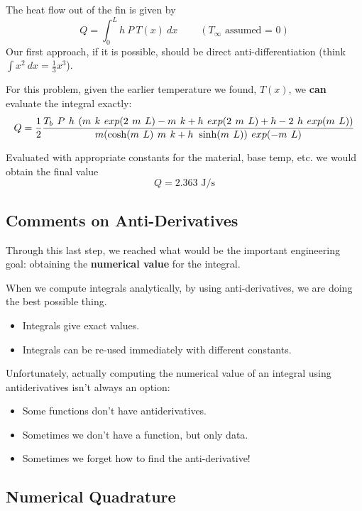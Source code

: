 The heat flow out of the fin is given by
$$
Q = \int_0^{L} h ~P ~T(x) ~dx   ~~~~~~~~~~ (T_\infty \mbox{ assumed = 0})
$$
Our first approach, if it is possible, should be direct
anti-differentiation (think $\int x^2 ~dx = \frac{1}{3}x^3$).

For this problem, given the earlier temperature we found, $T(x)$, we
{\bf can} evaluate the integral exactly:
$$ \large
Q =
\frac{1}{2}\frac{T_b~P~h~(m~k~exp(2~m~L)-m~k+h~exp(2~m~L)+h-2~h~exp(m~L))}{m(\cosh(m~L)~m~k+h~\sinh(m~L))~exp(-m~L)}
$$
 

Evaluated with appropriate constants for the material, base temp,
etc. we would obtain the final value $$Q = 2.363 \mbox{ J/s}$$

\newpage

\subsection*{Comments on Anti-Derivatives}

Through this last step, we reached what would be the important
engineering goal: obtaining the {\bf numerical value} for the
integral.

When we compute integrals analytically, by using anti-derivatives, we
are doing the best possible thing. 
\begin{itemize}
\item Integrals give exact values.
\item Integrals can be re-used immediately with different constants.
\end{itemize}
Unfortunately, actually computing the numerical value of an integral
using antiderivatives isn't always an option:
\begin{itemize}
\item Some functions don't have antiderivatives.  
\vspace{1cm}
\item Sometimes we don't have a function, but only data.
\vspace{1cm}
\item Sometimes we forget how to find the anti-derivative!
\vspace{1cm}
\end{itemize}

\newpage

\subsection*{Numerical Quadrature}

